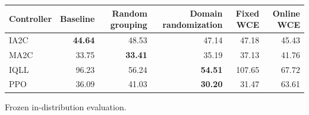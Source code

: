 \begin{tabular}{lrrrrr}
\hline
Controller & Baseline & Random grouping & Domain randomization & Fixed WCE & Online WCE \\
\hline
IA2C & \textbf{44.64} & 48.53 & 47.14 & 47.18 & 45.43 \\
MA2C & 33.75 & \textbf{33.41} & 35.19 & 37.13 & 41.76 \\
IQLL & 96.23 & 56.24 & \textbf{54.51} & 107.65 & 67.72 \\
PPO & 36.09 & 41.03 & \textbf{30.20} & 31.47 & 63.61 \\
\hline
\end{tabular}
Frozen in-distribution evaluation.
